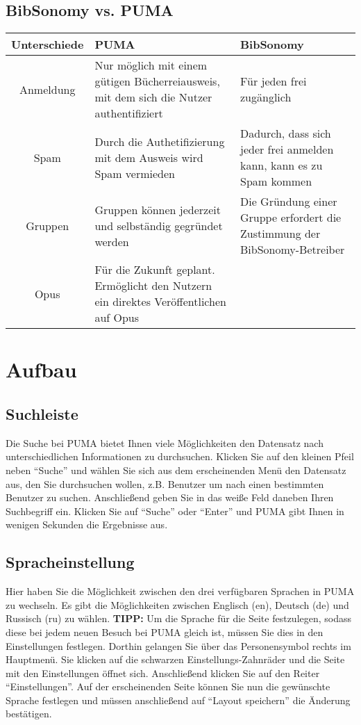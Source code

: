 \documentclass[a4paper,11pt,twoside]{scrbook}
\begin{document}
\subsection{BibSonomy vs. PUMA}
\begin{tabular}{|c|m{}|m{}|}\hline
	Unterschiede & PUMA & BibSonomy\\ \hline
	Anmeldung& Nur möglich mit einem gütigen Bücherreiausweis, mit dem sich die Nutzer authentifiziert  & Für jeden frei zugänglich \\ \hline
	Spam & Durch die Authetifizierung mit dem Ausweis wird Spam vermieden & Dadurch, dass sich jeder frei anmelden kann, kann es zu Spam kommen \\ \hline
	Gruppen & Gruppen können jederzeit und selbständig gegründet werden & Die Gründung einer Gruppe erfordert die Zustimmung der BibSonomy-Betreiber \\ \hline
	Opus & Für die Zukunft geplant. Ermöglicht den Nutzern ein direktes Veröffentlichen auf Opus & \\ \hline
\end{tabular}
\newpage
\section{Aufbau}
\subsection{Suchleiste}
Die Suche bei PUMA bietet Ihnen viele Möglichkeiten den Datensatz nach unterschiedlichen Informationen zu durchsuchen. Klicken Sie auf den kleinen Pfeil neben \enquote{Suche} und wählen Sie sich aus dem erscheinenden Menü den Datensatz aus, den Sie durchsuchen wollen, z.B. Benutzer um nach einen bestimmten Benutzer zu suchen. Anschließend geben Sie in das weiße Feld daneben Ihren Suchbegriff ein. Klicken Sie auf \enquote{Suche} oder \enquote{Enter} und PUMA gibt Ihnen in wenigen Sekunden die Ergebnisse aus.
\subsection{Spracheinstellung}
Hier haben Sie die Möglichkeit zwischen den drei verfügbaren Sprachen in PUMA zu wechseln. Es gibt die Möglichkeiten zwischen Englisch (en), Deutsch (de) und Russisch (ru) zu wählen.
\newline
\textbf{TIPP:} Um die Sprache für die Seite festzulegen, sodass diese bei jedem neuen Besuch bei PUMA gleich ist, müssen Sie dies in den Einstellungen festlegen. Dorthin gelangen Sie über das Personensymbol rechts im Hauptmenü. Sie klicken auf die schwarzen Einstellungs-Zahnräder und die Seite mit den Einstellungen öffnet sich. Anschließend klicken Sie auf den Reiter \enquote{Einstellungen}. Auf der erscheinenden Seite können Sie nun die gewünschte Sprache festlegen und müssen anschließend auf \enquote{Layout speichern} die Änderung bestätigen.
\end{document}
